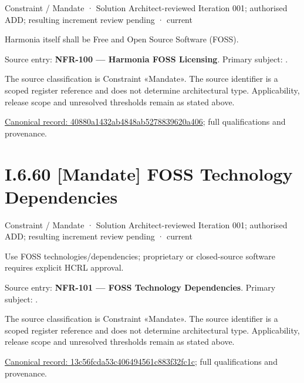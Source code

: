 \label{element:40880a1432ab4848ab5278839620a406}
{\small Constraint / Mandate · Solution Architect-reviewed Iteration 001; authorised ADD; resulting increment review pending · current}\par

Harmonia itself shall be Free and Open Source Software (FOSS).



Source entry: \textbf{NFR-100 — Harmonia FOSS Licensing}. Primary subject: \texttt{}.



The source classification is Constraint «Mandate». The source identifier is a scoped register reference and does not determine architectural type. Applicability, release scope and unresolved thresholds remain as stated above.


{\footnotesize \href{../../../../../../../../continuum/motivation/constraint/mandate/40880a1432ab4848ab5278839620a406.md}{Canonical record: 40880a1432ab4848ab5278839620a406}; full qualifications and provenance.}\par
\section*{I.6.60 [Mandate] FOSS Technology Dependencies}
\label{navigation:I.6.60}

\label{element:13c56fcda53c406494561c883f32fc1c}
{\small Constraint / Mandate · Solution Architect-reviewed Iteration 001; authorised ADD; resulting increment review pending · current}\par

Use FOSS technologies/dependencies; proprietary or closed-source software requires explicit HCRL approval.



Source entry: \textbf{NFR-101 — FOSS Technology Dependencies}. Primary subject: \texttt{}.



The source classification is Constraint «Mandate». The source identifier is a scoped register reference and does not determine architectural type. Applicability, release scope and unresolved thresholds remain as stated above.


{\footnotesize \href{../../../../../../../../continuum/motivation/constraint/mandate/13c56fcda53c406494561c883f32fc1c.md}{Canonical record: 13c56fcda53c406494561c883f32fc1c}; full qualifications and provenance.}\par
